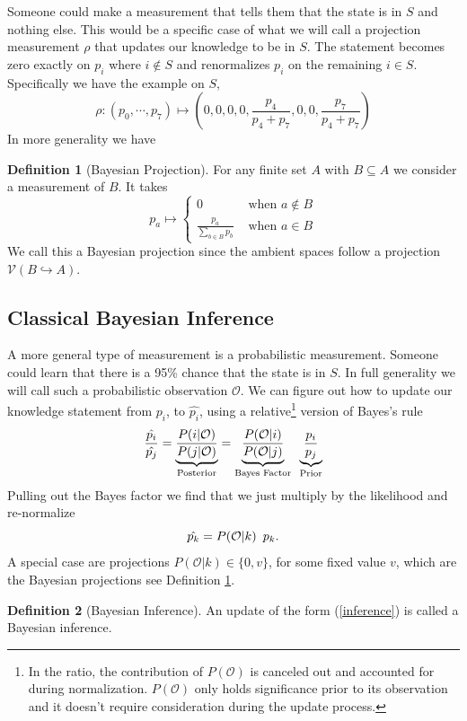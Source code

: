 \documentclass[12pt,a4paper]{article}
\theoremstyle{myrule}
\theoremstyle{postulate}
\theoremstyle{definition}
\newtheorem{definition}{Definition}[section]
\begin{document}
Someone could make a measurement that tells them that the state is in $S$ and nothing else.  This would be a specific case of what we will call a projection measurement $\rho$ that updates our knowledge to be in $S$.  The statement becomes zero exactly on $p_i$ where $i \not \in S$ and renormalizes $p_i$ on the remaining $i \in S$.  Specifically we have the example on $S$, 
\begin{equation}
\label{sdist}
\rho: (p_0,\cdots,p_7) \mapsto \left(0,0,0,0, \frac{p_4}{p_4 + p_7},0,0,\frac{p_7}{p_4 + p_7}\right)
\end{equation}
In more generality we have
\begin{definition}[Bayesian Projection]
\label{projdef}
For any finite set $A$ with $B \subseteq A$ we consider a measurement of $B$.  It takes
\[
p_a \mapsto \left\{ \begin{array}{cc} 0 &\text{ when } a \not \in B \\ \frac{p_a}{\sum_{b \in B} p_b} & \text{ when } a \in B \end{array} \right.
\]
We call this a Bayesian projection since the ambient spaces follow a projection $\mathcal{V}(B \hookrightarrow A)$.
\end{definition}
\subsection{Classical Bayesian Inference}
A more general type of measurement is a probabilistic measurement.  Someone could learn that there is a 95\% chance that the state is in $S$.  In full generality we will call such a probabilistic observation $\mathcal{O}$.  We can figure out how to update our knowledge statement from $p_i$, to $\hat{p_i}$, using a relative\footnote{In the ratio, the contribution of $P(\mathcal{O})$ is canceled out and accounted for during normalization.  $P(\mathcal{O})$ only holds significance prior to its observation and it doesn't require consideration during the update process.} version of Bayes's rule
\[
  \frac{\hat{p_i}}{\hat{p_j}} = \underbrace{\frac{P(i | \mathcal{O})}{P(j | \mathcal{O})}}_\text{Posterior}
                              = \underbrace{\frac{P(\mathcal{O} | i)}{P(\mathcal{O}|j)}}_\text{Bayes Factor}  \hspace{0.07 in}  \underbrace{\frac{p_i}{p_j}}_\text{Prior}
\]
Pulling out the Bayes factor we find that we just multiply by the likelihood and re-normalize
\begin{equation}
\label{inference}
  \hat{p_k} =  P(\mathcal{O} | k) \hspace{0.07 in} p_k.
\end{equation}
A special case are projections $P(\mathcal{O} | k) \in \{0,v\}$, for some fixed value $v$, which are the  Bayesian projections see Definition \ref{projdef}.
\begin{definition}[Bayesian Inference]
\label{infdef}
  An update of the form (\ref{inference}) is called a Bayesian inference.
\end{definition}
\end{document}
